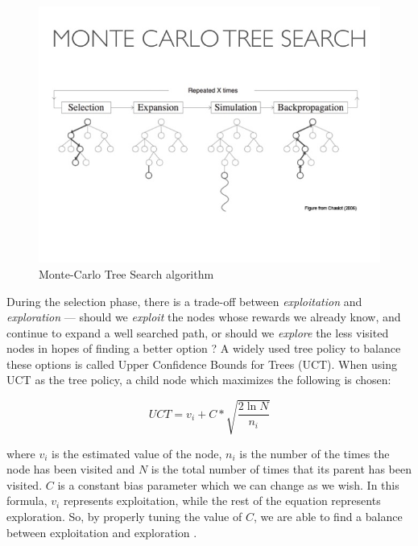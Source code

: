 \begin{figure}[h]
    \centering
    \includegraphics[clip, trim={0 4cm 0 5cm}, scale=.6]{images/mcts.jpg}
    \caption{Monte-Carlo Tree Search algorithm \cite{chaslot2008monte}}
    \label{fig:MCTS}
\end{figure}

During the selection phase, there is a trade-off between \textit{exploitation} and \textit{exploration} --- should we \textit{exploit} the nodes whose rewards we already know, and continue to expand a well searched path, or should we \textit{explore} the less visited nodes in hopes of finding a better option \cite{nakhost2009monte}?  A widely used tree policy to balance these options is called Upper Confidence Bounds for Trees (UCT).  When using UCT as the tree policy, a child node which maximizes the following is chosen:
    
\begin{equation}\label{eq:UCT}
    UCT = v_i + C * \sqrt{\frac{2\ln N}{n_i}}
\end{equation}
    
where $v_i$ is the estimated value of the node, $n_i$ is the number of the times the node has been visited and $N$ is the total number of times that its parent has been visited.  $C$ is a constant bias parameter which we can change as we wish.  In this formula, $v_i$ represents exploitation, while the rest of the equation represents exploration.  So, by properly tuning the value of $C$, we are able to find a balance between exploitation and exploration \cite{lucas2014fast, audibert2009exploration}.

